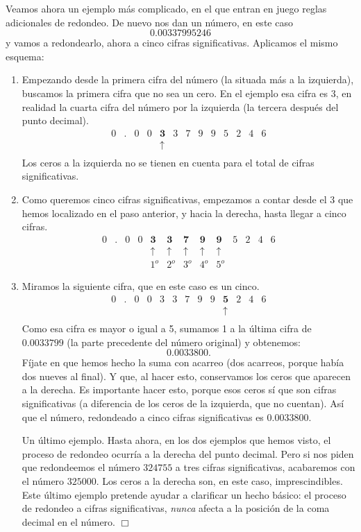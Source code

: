\begin{Ejemplo}
  Veamos ahora un ejemplo más complicado, en el que entran en juego reglas adicionales de redondeo. De nuevo nos dan un número, en este caso
  \[0.00337995246\]
  y vamos a redondearlo, ahora a cinco cifras significativas. Aplicamos el mismo esquema:
  \begin{enumerate}
  \item Empezando desde la primera cifra del número (la situada más a la izquierda), buscamos la primera cifra que no sea un cero. En el ejemplo esa cifra es $3$, en realidad la cuarta cifra del número por la izquierda (la tercera después del punto decimal).
  \[
    \begin{array}{cccccccccccccc}
      0&.&0&0&\mathbf{3}&3&7&9&9&5&2&4&6\\
      &&&&\mathbf{\uparrow}\\
    \end{array}
  \]
  Los ceros a la izquierda no se tienen en cuenta para el total de cifras significativas.
  \item Como queremos cinco cifras significativas, empezamos a contar desde el 3 que hemos localizado en el paso anterior, y  hacia la derecha, hasta llegar a  cinco cifras.
  \[
    \begin{array}{cccccccccccccc}
      0&.&0&0&\mathbf{3}&\mathbf{3}&\mathbf{7}&\mathbf{9}&\mathbf{9}&5&2&4&6\\
      &&&&\mathbf{\uparrow}&\mathbf{\uparrow}&\mathbf{\uparrow}&\mathbf{\uparrow}&\mathbf{\uparrow}\\
      &&&&1^o&2^o&3^o&4^o&5^o
    \end{array}
  \]
  \item Miramos la siguiente cifra, que en este caso es un cinco.
  \[
    \begin{array}{cccccccccccccc}
      0&.&0&0&{3}&{3}&{7}&{9}&{9}&\mathbf{5}&2&4&6\\
      &&&&&&&&&\mathbf{\uparrow}\\
    \end{array}
  \]
  Como esa cifra es mayor o igual a 5,  sumamos 1 a la última cifra de $0.0033799$ (la parte precedente del número original) y obtenemos:
  \[0.0033800.\]
  Fíjate en que hemos hecho la suma con acarreo (dos acarreos, porque había dos nueves al final). Y que, al hacer esto, conservamos los ceros que aparecen a la derecha. Es importante hacer esto, porque esos ceros sí que son cifras significativas (a diferencia de los ceros de la izquierda, que no cuentan).
  Así que el número, redondeado a cinco cifras significativas es $0.0033800$.

  Un último ejemplo. Hasta ahora, en los dos ejemplos que hemos visto, el proceso de redondeo ocurría a la derecha del punto decimal. Pero si nos
  piden que redondeemos el número $324755$ a tres cifras significativas, acabaremos con el número $325000$. Los ceros a la derecha son, en este caso,
  imprescindibles. Este último ejemplo pretende ayudar a clarificar un hecho básico: el proceso de redondeo a cifras significativas, {\em nunca} afecta a la
  posición de la coma decimal en el número.  \flushright$\Box$
\end{enumerate}
\end{Ejemplo}
